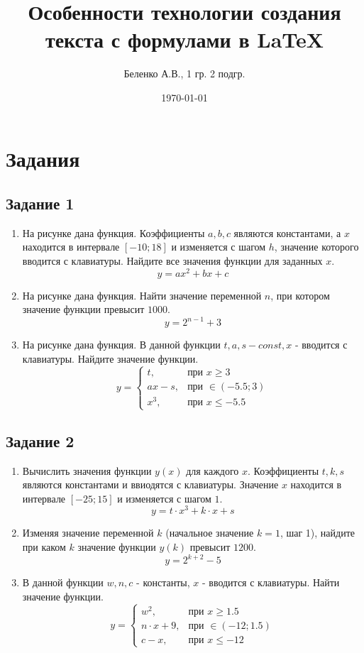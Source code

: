 \documentclass[a4paper,12pt]{article} %
\author{Беленко А.В., 1 гр. 2 подгр.}
\title{Особенности технологии создания текста с формулами в \LaTeX{}}
\date{\today}
\begin{document}
\maketitle
\newpage
\section{Задания}
\subsection{Задание 1}
\begin{enumerate} 
  \item 
  На рисунке дана функция. Коэффициенты $a, b, c$ являются константами, а $x$ находится в интервале $[-10; 18]$ и изменяется с шагом $h$, значение которого вводится с клавиатуры. Найдите все значения функции для заданных $x$. $$y = ax^{2}+bx+c$$
  \item
  На рисунке дана функция. Найти значение переменной $n$, при котором значение функции превысит $1000$. $$y = 2^{n-1}+3$$
  \item
  На рисунке дана функция. В данной функции $t, a, s - const, x$ - вводится с клавиатуры. Найдите значение функции.
    \begin{equation*}
        y = 
        \begin{cases}
            t, &\text{при $x\geq 3$}\\
            ax-s, &\text{при $\in (-5.5;3)$}\\
            x^{3}, &\text{при $x\leq -5.5$}
        \end{cases}
    \end{equation*}
\end{enumerate}
\subsection{Задание 2}
\begin{enumerate} 
    \item
    Вычислить значения функции $y(x)$ для каждого $x$. Коэффициенты $t, k, s$ являются константами и ввиодятся с клавиатуры. Значение $x$ находится в интервале $[-25; 15]$ и изменяется с шагом $1$.
    $$y = t\cdot x^{3} + k\cdot x + s$$
    \item
    Изменяя значение переменной $k$ (начальное значение $k=1$, шаг 1), найдите при каком $k$ значение функции $y(k)$ превысит $1200$.
    $$y = 2^{k+2}-5$$
    \item
    В данной функции $w, n, c$ - константы, $x$ - вводится с клавиатуры. Найти значение функции.
    \begin{equation*}
        y = 
        \begin{cases}
            w^{2}, &\text{при $x\geq 1.5$}\\
            n\cdot x+9, &\text{при $\in (-12;1.5)$}\\
            c-x, &\text{при $x\leq -12$}
        \end{cases}
    \end{equation*}
\end{enumerate}
\end{document}

